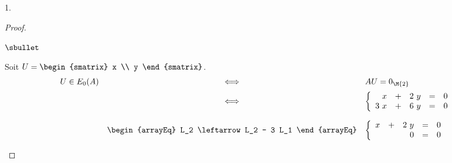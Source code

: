 \begin{noliste}{1.}
\begin{proof}
\begin{noliste}{$\sbullet$}
    \item Soit $U =
      \begin{smatrix}
        x \\
        y
      \end{smatrix}
      $.
      \[
      \begin{array}{rcl}
        U \in E_0(A) & \Longleftrightarrow & AU = 0_{\M{2}}
        \\[.2cm]
        & \Longleftrightarrow & 
        \left\{
          \begin{array}{rcrcl}
            x & + & 2 \ y & = & 0 \\
            3 \ x & + & 6 \ y & = & 0 
          \end{array}
        \right.
        \\[.6cm]
        &
        \begin{arrayEq}
          L_2 \leftarrow L_2 - 3 L_1 
        \end{arrayEq}
        & 
        \left\{
          \begin{array}{rcrcl}
            x & + & 2 \ y & = & 0 \\
            & & 0 & = & 0 
          \end{array}
        \right.
      \end{array}
      \]


      \newpage



\end{noliste}
\end{proof}
\end{noliste}
